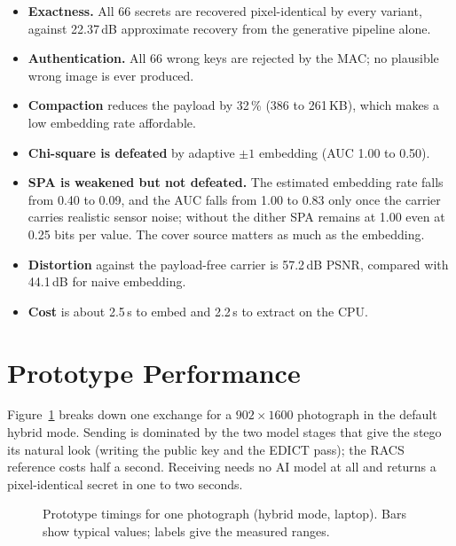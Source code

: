 \begin{itemize}
	\item \textbf{Exactness.} All 66 secrets are recovered pixel-identical by every variant,
	against 22.37\,dB approximate recovery from the generative pipeline alone.
	\item \textbf{Authentication.} All 66 wrong keys are rejected by the MAC; no plausible wrong
	image is ever produced.
	\item \textbf{Compaction} reduces the payload by 32\,\% (386 to 261\,KB), which makes a low
	embedding rate affordable.
	\item \textbf{Chi-square is defeated} by adaptive $\pm1$ embedding (AUC 1.00 to 0.50).
	\item \textbf{SPA is weakened but not defeated.} The estimated embedding rate falls from 0.40
	to 0.09, and the AUC falls from 1.00 to 0.83 only once the carrier carries realistic sensor
	noise; without the dither SPA remains at 1.00 even at 0.25 bits per value. The cover source
	matters as much as the embedding.
	\item \textbf{Distortion} against the payload-free carrier is 57.2\,dB PSNR, compared with
	44.1\,dB for naive embedding.
	\item \textbf{Cost} is about 2.5\,s to embed and 2.2\,s to extract on the CPU.
\end{itemize}

\section{Prototype Performance}
Figure~\ref{fig:app} breaks down one exchange for a $902\times1600$ photograph in the default
hybrid mode. Sending is dominated by the two model stages that give the stego its natural look
(writing the public key and the EDICT pass); the RACS reference costs half a second. Receiving
needs no AI model at all and returns a pixel-identical secret in one to two seconds.

\begin{figure}[H]
	\centering
	\caption{Prototype timings for one photograph (hybrid mode, laptop). Bars show typical values; labels give the measured ranges.}
	\label{fig:app}
\end{figure}

